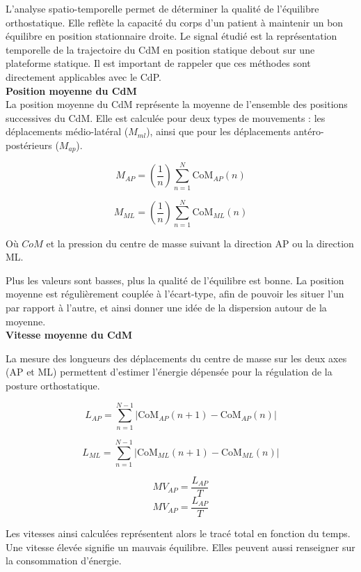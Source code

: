 L'analyse spatio-temporelle permet de déterminer la qualité de l'équilibre orthostatique. 
Elle reflète la capacité du corps d'un patient à maintenir un bon équilibre en position stationnaire droite. 
Le signal étudié est la représentation temporelle de la trajectoire du CdM en position statique debout sur une plateforme statique. 
Il est important de rappeler que ces méthodes sont directement applicables avec le CdP.\\


\textbf{Position moyenne du CdM}\\


La position moyenne du CdM représente la moyenne de l'ensemble des positions successives du CdM. 
Elle est calculée pour deux types de mouvements : les déplacements médio-latéral ($M_{ml}$), ainsi que pour les déplacements antéro-postérieurs ($M_{ap}$).

\[
M_{AP} = \left( \frac{1}{n} \right) \sum_{n=1}^N \mbox{CoM}_{AP}(n) \tag{2}
\]

\[
M_{ML} = \left( \frac{1}{n} \right) \sum_{n=1}^N \mbox{CoM}_{ML}(n) \tag{3}
\]

Où $CoM$ et la pression du centre de masse suivant la direction AP ou la direction ML.

Plus les valeurs sont basses, plus la qualité de l'équilibre est bonne. 
La position moyenne est régulièrement couplée à l'écart-type, afin de pouvoir les situer l'un par rapport à l'autre, et ainsi donner une idée de la dispersion autour de la moyenne.\\

\textbf{Vitesse moyenne du CdM}


La mesure des longueurs des déplacements du centre de masse sur les deux axes (AP et ML) permettent d'estimer l'énergie dépensée pour la régulation de la posture orthostatique.

\[
L_{AP} = \sum_{n=1}^{N-1} \left| \mbox{CoM}_{AP}(n+1) - \mbox{CoM}_{AP}(n) \right| \tag{4}
\]

\[
L_{ML} = \sum_{n=1}^{N-1} \left| \mbox{CoM}_{ML}(n+1) - \mbox{CoM}_{ML}(n) \right| \tag{5}
\]

\[
MV_{AP} = \frac{L_{AP}}{T} \tag{6}
\]
\[
MV_{AP} = \frac{L_{AP}}{T} \tag{7} 
\]

Les vitesses ainsi calculées représentent alors le tracé total en fonction du temps. 
Une vitesse élevée signifie un mauvais équilibre. 
Elles peuvent aussi renseigner sur la consommation d'énergie.\\

